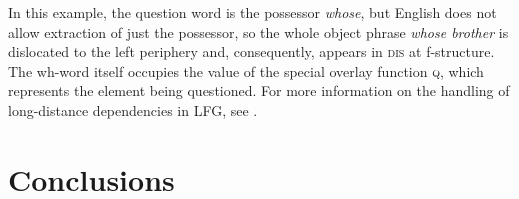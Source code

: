 \documentclass[output=paper]{../langscibook}
\begin{document}
 \ea\label{ex:gfs:whose-brother}
 \z
 
 \noindent In this example, the question word is the possessor \textit{whose}, but English does not allow extraction of just the possessor, so the whole object phrase \textit{whose brother} is dislocated to the left periphery and, consequently, appears in \textsc{dis} at f-structure. The wh-word itself occupies the value of the special overlay function \textsc{q}, which represents the element being questioned. For more information on the handling of long-distance dependencies in LFG, see .
 
 
 \section{Conclusions}
 
\end{document}
